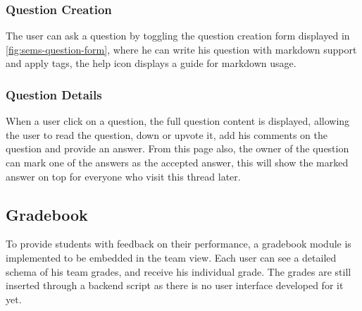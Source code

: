 \subsubsection{Question Creation}
\label{subs:question-creation}
The user can ask a question by toggling the question creation form displayed in \ref{fig:sems-question-form}, where he can
write his question with markdown support and apply tags, the help icon displays a guide for markdown usage.

\subsubsection{Question Details}
\label{subs:question-details}
When a user click on a question, the full question content is displayed, allowing the user to read the question, down or upvote it, add his comments
on the question and provide an answer. From this page also, the owner of the question can mark one of the answers as the accepted answer, this
will show the marked answer on top for everyone who visit this thread later.


\subsection{Gradebook}
\label{sub:gradebook}
To provide students with feedback on their performance, a gradebook module is implemented to be embedded in the team view. Each
user can see a detailed schema of his team grades, and receive his individual grade. The grades are still inserted through a backend
script as there is no user interface developed for it yet.
